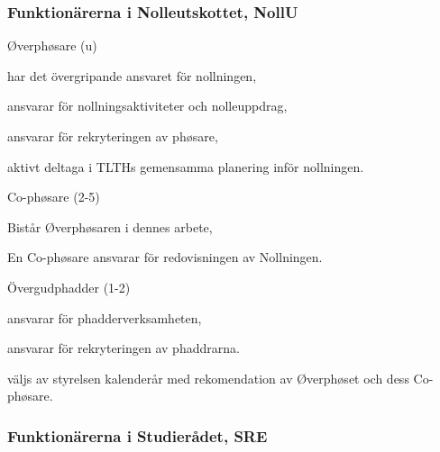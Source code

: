 \documentclass[10pt]{article}
\begin{document}
\subsubsection{Funktionärerna i Nolleutskottet, NollU}

\begin{emptylist}
    \item Øverphøsare (u)
        \begin{dashlist}
            \item har det övergripande ansvaret för nollningen,
            \item ansvarar för nollningsaktiviteter och nolleuppdrag,
            \item ansvarar för rekryteringen av phøsare,
            \item aktivt deltaga i TLTHs gemensamma planering inför nollningen.
        \end{dashlist}
    \item Co-phøsare (2-5)
        \begin{dashlist}
            \item Bistår Øverphøsaren i dennes arbete,
            \item En Co-phøsare ansvarar för redovisningen av Nollningen.
        \end{dashlist}
    \item Övergudphadder (1-2)
        \begin{dashlist}
            \item ansvarar för phadderverksamheten,
            \item ansvarar för rekryteringen av phaddrarna.
            \item väljs av styrelsen kalenderår med rekomendation av Øverphøset och dess Co-phøsare.
        \end{dashlist}
\end{emptylist}
\subsubsection{Funktionärerna i Studierådet, SRE}
\end{document}
